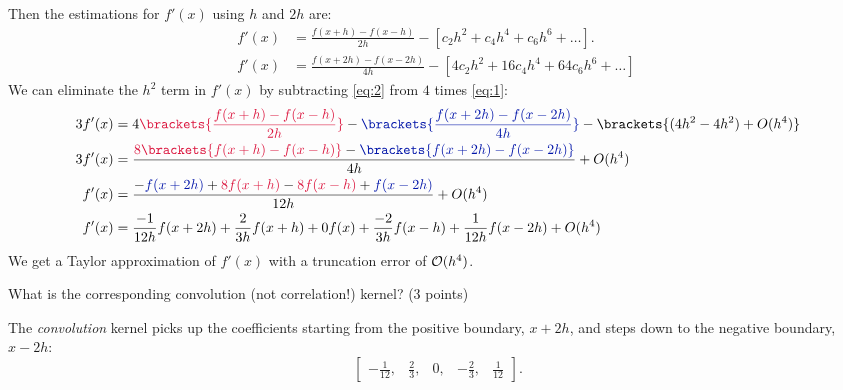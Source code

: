 \begin{problem}
\begin{enumroman}
\begin{Answer}
        Then the estimations for $f'(x)$ using $h$ and $2h$ are:
        \begin{align}
          f'(x) &= \frac{f(x+h) - f(x-h)}{2h} - \left[ c_2 h^2 + c_4 h^4 + c_6 h^6 + \ldots \right].~\label{eq:1} \\
          f'(x) &= \frac{f(x+2h) - f(x-2h)}{4h} - \left[ 4c_2 h^2 + 16 c_4 h^4 + 64 c_6h^6 + \ldots \right]~\label{eq:2}
        \end{align}
        We can eliminate the $h^2$ term in $f'(x)$ by subtracting \ref{eq:2} from $4$ times \ref{eq:1}:
        \begin{align*}
          3f'(x) &= 4 \crim{\brackets{\frac{f(x+h) - f(x-h)}{2h}}} - \zaff{\brackets{\frac{f(x+2h) - f(x-2h)}{4h}}} - \brackets{(4h^2 - 4h^2) + O(h^4)} \\
          3f'(x) &= \frac{\crim{8\brackets{f(x+h) - f(x-h)}} - \zaff{\brackets{f(x+2h) - f(x-2h)}}}{4h} + O(h^4) \\
          f'(x) &= \frac{-\zaff{f(x+2h)} + \crim{8f(x+h)} - \crim{8f(x-h)} + \zaff{f(x-2h)}}{12h} + O(h^4) \\
          f'(x) &= \frac{-1}{12h}f(x+2h) + \frac{2}{3h}f(x+h) + 0f(x) + \frac{-2}{3h}f(x-h) + \frac{1}{12h}f(x-2h) + O(h^4)
        \end{align*}
        We get a Taylor approximation of $f'(x)$ with a truncation error of $\mathcal{O}(h^4)$.  
      \end{Answer}
    \item What is the corresponding convolution (not correlation!) kernel? (3 points)
    \begin{Answer}
      The \emph{convolution} kernel picks up the coefficients starting from the positive boundary,
      $x+2h$, and steps down to the negative boundary, $x-2h$:
      \[
        \begin{bmatrix}
          -\frac{1}{12}, & \frac{2}{3}, &0, & -\frac{2}{3}, & \frac{1}{12}
        \end{bmatrix}.
      \]
    \end{Answer}
  \end{enumroman}
\end{problem}

